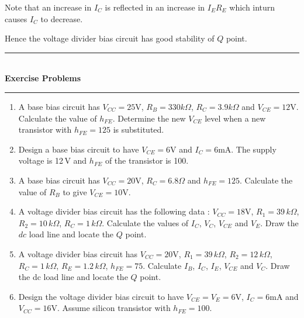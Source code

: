 Note that an increase in $I_{C}$ is reflected in an increase in $I_{E}R_{E}$ which inturn causes $I_{C}$ to decrease. 

Hence the voltage divider bias circuit has good stability of $Q$ point.

\smallskip
\begin{center}
\rule{5cm}{1pt}\\[-2pt]
{\bf Exercise Problems}\\[-4pt]
\rule{5cm}{1pt}
\end{center}

\begin{enumerate}
\renewcommand{\labelenumi}{\bf\theenumi.}
\item A base bias circuit has $V_{CC}=25\text{V}$, $R_{B}=330k\Omega$, $R_{C}=3.9k\Omega$ and $V_{CE}=12\text{V}$. Calculate the value of $h_{FE}$. Determine the new $V_{CE}$ level when a new transistor with $h_{FE}=125$ is substituted.

\item Design a base bias circuit to have $V_{CE}=6\text{V}$ and $I_{C}=6\text{mA}$. The supply voltage is 12\,V and $h_{FE}$ of the transistor is 100.

\item A base bias circuit has $V_{CC}=20\text{V}$, $R_{C}=6.8\Omega$ and $h_{FE}=125$. Calculate the value of $R_{B}$ to give $V_{CE}=10\text{V}$.

\item A voltage divider bias circuit has the following data : $V_{CC}=18\text{V}$, $R_{1}=39\,k\Omega$, $R_{2}=10\,k\Omega$, $R_{C}=1\,k\Omega$. Calculate the values of $I_{C}$, $V_{C}$, $V_{CE}$ and $V_{E}$. Draw the $dc$ load line and locate the $Q$ point.

\item A voltage divider bias circuit has $V_{CC}=20\text{V}$, $R_{1}=39\,k\Omega$, $R_{2}=12\,k\Omega$, $R_{C}=1\,k\Omega$, $R_{E}=1.2\,k\Omega$, $h_{FE}=75$. Calculate $I_{B}$, $I_{C}$, $I_{E}$, $V_{CE}$ and $V_{C}$. Draw the dc load line and locate the $Q$ point.

\item Design the voltage divider bias circuit to have $V_{CE}=V_{E}=6\text{V}$, $I_{C}=6\text{mA}$ and $V_{CC}=16\text{V}$. Assume silicon transistor with $h_{FE}=100$.
\end{enumerate}


